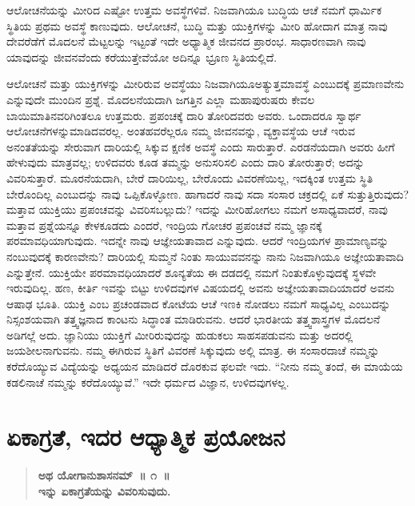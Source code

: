 \vskip 0.3cm

ಆಲೋಚನೆಯನ್ನು ಮೀರಿದ ಎಷ್ಟೋ ಉತ್ತಮ ಅವಸ್ಥೆಗಳಿವೆ. ನಿಜವಾಗಿಯೂ ಬುದ್ಧಿಯ ಆಚೆ ನಮಗೆ ಧಾರ್ಮಿಕ ಸ್ಥಿತಿಯ ಪ್ರಥಮ ಅವಸ್ಥೆ ಕಾಣುವುದು. ಆಲೋಚನೆ, ಬುದ್ಧಿ ಮತ್ತು ಯುಕ್ತಿಗಳನ್ನು ಮೀರಿ ಹೋದಾಗ ಮಾತ್ರ ನಾವು ದೇವರೆಡೆಗೆ ಮೊದಲನೆ ಮೆಟ್ಟಲನ್ನು ಇಟ್ಟಂತೆ ಇದೇ ಅಧ್ಯಾತ್ಮಿಕ ಜೀವನದ ಪ್ರಾರಂಭ. ಸಾಧಾರಣವಾಗಿ ನಾವು ಯಾವುದನ್ನು ಜೀವನವೆಂದು ಕರೆಯುತ್ತೇವೆಯೋ ಅದಿನ್ನೂ ಭ್ರೂಣ ಸ್ಥಿತಿಯಲ್ಲಿದೆ. 

\vskip 0.3cm

ಆಲೋಚನೆ ಮತ್ತು ಯುಕ್ತಿಗಳನ್ನು ಮೀರಿರುವ ಅವಸ್ಥೆಯು ನಿಜವಾಗಿಯೂ\break ಅತ್ಯುತ್ತಮಾವಸ್ಥೆ ಎಂಬುದಕ್ಕೆ ಪ್ರಮಾಣವೇನು ಎನ್ನುವುದೇ ಮುಂದಿನ ಪ್ರಶ್ನೆ. ಮೊದಲನೆಯದಾಗಿ ಜಗತ್ತಿನ ಎಲ್ಲಾ ಮಹಾಪುರುಷರು ಕೇವಲ ಬಾಯಿಮಾತಿನವರಿಗಿಂತಲೂ ಉತ್ತಮರು. ಪ್ರಪಂಚಕ್ಕೆ ದಾರಿ ತೋರಿದವರು ಅವರು. ಒಂದಾದರೂ ಸ್ವಾರ್ಥ ಆಲೋಚನೆಗಳನ್ನು\break ಮಾಡಿದವರಲ್ಲ. ಅಂತಹವರೆಲ್ಲರೂ ನಮ್ಮ ಜೀವನವನ್ನು, ವ್ಯಕ್ತಾವಸ್ಥೆಯ ಆಚೆ ಇರುವ ಅನಂತತೆಯನ್ನು ಸೇರುವಾಗ ದಾರಿಯಲ್ಲಿ ಸಿಕ್ಕುವ ಕ್ಷಣಿಕ ಅವಸ್ಥೆ ಎಂದು ಸಾರುತ್ತಾರೆ. ಎರಡನೆಯದಾಗಿ ಅವರು ಹೀಗೆ ಹೇಳುವುದು ಮಾತ್ರವಲ್ಲ; ಉಳಿದವರು ಕೂಡ ತಮ್ಮನ್ನು ಅನುಸರಿಸಲಿ ಎಂದು ದಾರಿ ತೋರುತ್ತಾರೆ; ಅದನ್ನು ವಿವರಿಸುತ್ತಾರೆ. ಮೂರನೆಯದಾಗಿ, ಬೇರೆ ದಾರಿಯಿಲ್ಲ, ಬೇರೊಂದು ವಿವರಣೆಯಿಲ್ಲ, ಇದಕ್ಕಿಂತ ಉತ್ತಮ ಸ್ಥಿತಿ ಬೇರೊಂದಿಲ್ಲ ಎಂಬುದನ್ನು ನಾವು ಒಪ್ಪಿಕೊಳ್ಳೋಣ. ಹಾಗಾದರೆ ನಾವು ಸದಾ ಸಂಸಾರ ಚಕ್ರದಲ್ಲಿ ಏಕೆ ಸುತ್ತುತ್ತಿರುವುದು? ಮತ್ತಾವ ಯುಕ್ತಿಯು ಪ್ರಪಂಚವನ್ನು ವಿವರಿಸಬಲ್ಲುದು? ಇದನ್ನು ಮೀರಿಹೋಗಲು ನಮಗೆ ಅಸಾಧ್ಯವಾದರೆ, ನಾವು ಮತ್ತಾವ ಪ್ರಶ್ನೆಯನ್ನೂ ಕೇಳಕೂಡದು ಎಂದರೆ, ಇಂದ್ರಿಯ ಗೋಚರ ಪ್ರಪಂಚವೆ ನಮ್ಮ ಜ್ಞಾನಕ್ಕೆ ಪರಮಾವಧಿಯಾಗುವುದು. ಇದನ್ನೇ ನಾವು ಆಜ್ಞೇಯತಾವಾದ ಎನ್ನುವುದು. ಆದರೆ ಇಂದ್ರಿಯಗಳ ಪ್ರಾಮಾಣ್ಯವನ್ನು ನಂಬುವುದಕ್ಕೆ ಕಾರಣವೇನು? ದಾರಿಯಲ್ಲಿ ಸುಮ್ಮನೆ ನಿಂತು ಸಾಯುವವನನ್ನು ನಾನು ನಿಜವಾಗಿಯೂ ಅಜ್ಞೇಯತಾವಾದಿ ಎನ್ನುತ್ತೇನೆ. ಯುಕ್ತಿಯೇ ಪರಮಾವಧಿಯಾದರೆ ಶೂನ್ಯತೆಯ ಈ ದಡದಲ್ಲಿ ನಮಗೆ ನಿಂತುಕೊಳ್ಳುವುದಕ್ಕೆ ಸ್ಥಳವೇ ಇರುವುದಿಲ್ಲ. ಹಣ, ಕೀರ್ತಿ ಇವನ್ನು ಬಿಟ್ಟು ಉಳಿದವುಗಳ ವಿಷಯದಲ್ಲಿ ಅವನು ಅಜ್ಞೇಯತಾವಾದಿಯಾದರೆ ಅವನು ಆಷಾಢ ಭೂತಿ. ಯುಕ್ತಿ ಎಂಬ ಪ್ರಚಂಡವಾದ ಕೋಟೆಯ ಆಚೆ ಇಣಕಿ ನೋಡಲು ನಮಗೆ ಸಾಧ್ಯವಿಲ್ಲ ಎಂಬುದನ್ನು ನಿಸ್ಸಂಶಯವಾಗಿ ತತ್ತ್ವಜ್ಞನಾದ ಕಾಂಟನು ಸಿದ್ಧಾಂತ ಮಾಡಿರುವನು. ಆದರೆ ಭಾರತೀಯ ತತ್ತ್ವಶಾಸ್ತ್ರಗಳ ಮೊದಲನೆ ಅಡಿಗಲ್ಲೆ ಅದು. ಜ್ಞಾನಿಯು ಯುಕ್ತಿಗೆ ಮೀರಿರುವುದನ್ನು ಹುಡುಕಲು ಸಾಹಸಪಡುವನು ಮತ್ತು ಅದರಲ್ಲಿ ಜಯಶೀಲನಾಗುವನು. ನಮ್ಮ ಈಗಿರುವ ಸ್ಥಿತಿಗೆ ವಿವರಣೆ ಸಿಕ್ಕುವುದು ಅಲ್ಲಿ ಮಾತ್ರ. ಈ ಸಂಸಾರದಾಚೆ ನಮ್ಮನ್ನು ಕರೆದೊಯ್ಯುವ ವಿದ್ಯೆಯನ್ನು ಅಧ್ಯಯನ ಮಾಡಿದರೆ ದೊರಕುವ ಫಲವೇ ಇದು. “ನೀನು ನಮ್ಮ ತಂದೆ, ಈ ಮಾಯೆಯ ಕಡಲಿನಾಚೆ ನಮ್ಮನ್ನು ಕರೆದೊಯ್ಯುವೆ.” ಇದೇ ಧರ್ಮದ ವಿಜ್ಞಾನ, ಉಳಿದವುಗಳಲ್ಲ.

\chapter{ಏಕಾಗ್ರತೆ, ಇದರ ಆಧ್ಯಾತ್ಮಿಕ ಪ್ರಯೋಜನ}%

\vskip 0.3cm

\begin{verse}
\textbf{ಅಥ ಯೋಗಾನುಶಾಸನಮ್​~॥ ೧~॥\\ಇನ್ನು ಏಕಾಗ್ರತೆಯನ್ನು ವಿವರಿಸುವುದು.}
\end{verse}

